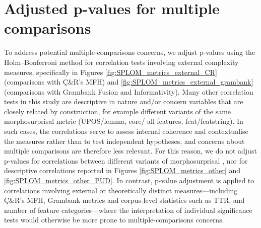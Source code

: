 \documentclass[USenglish]{article}
\providecommand{\DIFaddtex}[1]{{\protect\color{blue}\uwave{#1}}} %
\providecommand{\DIFaddbegin}{} %
\providecommand{\DIFaddend}{} %
\providecommand{\DIFadd}[1]{\texorpdfstring{\DIFaddtex{#1}}{#1}} %
\providecommand{\DIFaddincludegraphics}[2][]{{\color{blue}\fbox{\DIFOincludegraphics[#1]{#2}}}} %
\DeclareRobustCommand{\DIFaddbegin}{\DIFOaddbegin \let\includegraphics\DIFaddincludegraphics} %
\DeclareRobustCommand{\DIFaddend}{\DIFOaddend \let\includegraphics\DIFOincludegraphics} %
\begin{document}
\DIFaddend \section{Adjusted p-values for multiple comparisons}\label{subsec:adjustedPValues}
To address potential multiple-comparisons concerns, we adjust p-values using the Holm–Bonferroni method \citep{holm_simple_1979} for correlation tests involving external complexity measures, specifically in Figures \ref{fig:SPLOM_metrics_external_CR} (comparisons with Ç\&R’s MFH) and \ref{fig:SPLOM_metrics_external_grambank} (comparisons with Grambank Fusion and Informativity).
Many other correlation tests in this study are descriptive in nature and/or concern variables that are closely related by construction, for example different variants of the same morpho\DIFaddbegin \DIFadd{-}\DIFaddend surprisal metric (UPOS/lemma, core/ all features, feat/featstring). 
In such cases, the correlations serve to assess internal coherence and contextualise the measures rather than to test independent hypotheses, and concerns about multiple comparisons are therefore less relevant.
For this reason, we do not adjust p-values for correlations between different variants of morpho\DIFaddbegin \DIFadd{-}\DIFaddend surprisal , nor for descriptive correlations reported in Figures \ref{fig:SPLOM_metrics_other} and \ref{fig:SPLOM_metrics_other_PUD}. 
In contrast, p-value adjustment is applied to correlations involving external or theoretically distinct measures—including Ç\&R’s MFH, Grambank metrics and corpus-level statistics such as TTR, and number of feature categories—where the interpretation of individual significance tests would otherwise be more prone to multiple-comparisons concerns.
\end{document}
